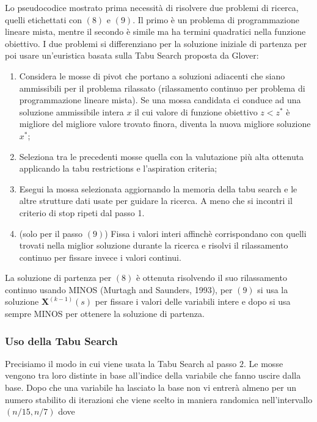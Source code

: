 \documentclass[
]{article}
\providecommand{\tightlist}{%
  \setlength{\itemsep}{0pt}\setlength{\parskip}{0pt}}
\begin{document}
Lo pseudocodice mostrato prima necessità di risolvere due problemi di
ricerca, quelli etichettati con {\((8)\)} e {\((9)\)}. Il primo è un
problema di programmazione lineare mista, mentre il secondo è simile ma ha termini quadratici nella funzione obiettivo. I due problemi si
differenziano per la soluzione iniziale di partenza per poi usare
un'euristica basata sulla Tabu Search proposta da Glover:

\begin{enumerate}
\tightlist
\item
  Considera le mosse di pivot che portano a soluzioni adiacenti che
  siano ammissibili per il problema rilassato (rilassamento continuo per
  problema di programmazione lineare mista). Se una mossa candidata ci
  conduce ad una soluzione ammissibile intera {\(x\)} il cui valore di
  funzione obiettivo {\(z < z^{\ast}\)} è migliore del migliore valore
  trovato finora, diventa la nuova migliore soluzione {\(x^{\ast}\)};
\item
  Seleziona tra le precedenti mosse quella con la valutazione più alta
  ottenuta applicando la tabu restrictions e l'aspiration criteria;
\item
  Esegui la mossa selezionata aggiornando la memoria della tabu search e
  le altre strutture dati usate per guidare la ricerca. A meno che si
  incontri il criterio di stop ripeti dal passo 1.
\item
  (solo per il passo {\((9)\)}) Fissa i valori interi affinchè
  corrispondano con quelli trovati nella miglior soluzione durante la
  ricerca e risolvi il rilassamento continuo per fissare invece i valori
  continui.
\end{enumerate}
La soluzione di partenza per {\((8)\)} è ottenuta risolvendo il suo
rilassamento continuo usando MINOS (Murtagh and Saunders, 1993), per
{\((9)\)} si usa la soluzione {\(\mathbf{X}^{(k - 1)}(s)\)} per fissare
i valori delle variabili intere e dopo si usa sempre MINOS per ottenere
la soluzione di partenza.
\hypertarget{uso-della-tabu-search}{%
\subsubsection{Uso della Tabu Search}\label{uso-della-tabu-search}}
Precisiamo il modo in cui viene usata la Tabu Search al passo {\(2.\)}
Le mosse vengono tra loro distinte in base all'indice della variabile
che fanno uscire dalla base. Dopo che una variabile ha lasciato la base
non vi entrerà almeno per un numero stabilito di iterazioni che viene
scelto in maniera randomica nell'intervallo {\((n/15,n/7)\)} dove
\end{document}
